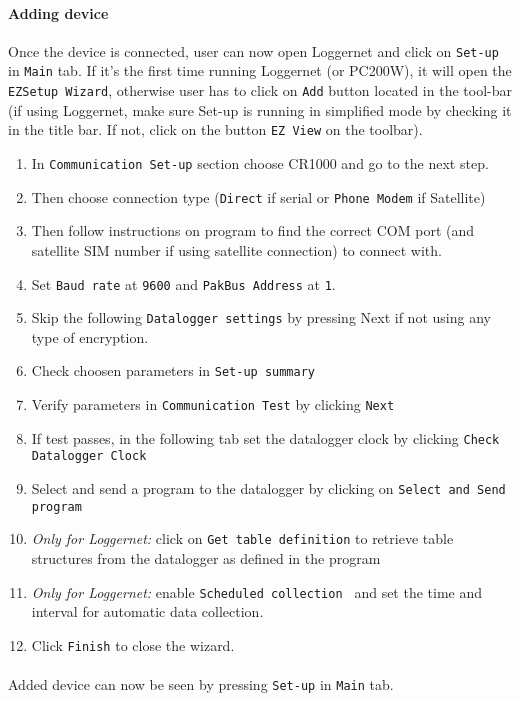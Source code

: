 \paragraph{Adding device}
Once the device is connected, user can now open Loggernet and click on {\tt Set-up} in {\tt Main} tab. If it's the first time running Loggernet (or PC200W), it will open the {\tt EZSetup Wizard}, 
otherwise user has to click on {\tt Add} button located in the tool-bar (if using Loggernet, make sure Set-up is running in simplified mode by checking it in the title bar. If not, click on the button {\tt EZ View} on the toolbar).
\begin{enumerate}
	\item In {\tt Communication Set-up} section choose CR1000 and go to the next step.
	\item Then choose connection type ({\tt Direct} if serial or {\tt Phone Modem} if Satellite)
	\item Then follow instructions on program to find the correct COM port (and satellite SIM number if using satellite connection) to connect with.
	\item Set {\tt Baud rate} at {\tt 9600} and {\tt PakBus Address} at {\tt 1}.
	\item Skip the following {\tt Datalogger settings} by pressing Next if not using any type of encryption.
	\item Check choosen parameters in {\tt Set-up summary}
	\item Verify parameters in {\tt Communication Test} by clicking {\tt Next}
	\item If test passes, in the following tab set the datalogger clock by clicking {\tt Check Datalogger Clock}
	\item Select and send a program to the datalogger by clicking on {\tt Select and Send program}
	\item \emph{Only for Loggernet:} click on {\tt Get table definition} to retrieve table structures from the datalogger as defined in the program
	\item \emph{Only for Loggernet:} enable {\tt Scheduled collection }  and set the time  and interval for automatic data collection.
	\item Click {\tt Finish} to close the wizard.
\end{enumerate}
\paragraph{}
Added device can now be seen by pressing {\tt Set-up} in {\tt Main} tab.

